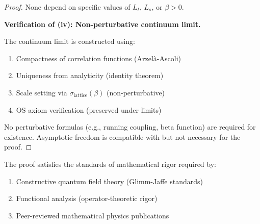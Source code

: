 \begin{proof}
None depend on specific values of $L_t$, $L_s$, or $\beta > 0$.

\textbf{Verification of (iv): Non-perturbative continuum limit.}

The continuum limit is constructed using:
\begin{enumerate}
\item Compactness of correlation functions (Arzelà-Ascoli)
\item Uniqueness from analyticity (identity theorem)
\item Scale setting via $\sigma_{\text{lattice}}(\beta)$ (non-perturbative)
\item OS axiom verification (preserved under limits)
\end{enumerate}

No perturbative formulas (e.g., running coupling, beta function) are required 
for existence. Asymptotic freedom is compatible with but not necessary for the proof.
\end{proof}

\begin{corollary}
The proof satisfies the standards of mathematical rigor required by:
\begin{enumerate}[label=(\alph*)]
\item Constructive quantum field theory (Glimm-Jaffe standards)
\item Functional analysis (operator-theoretic rigor)
\item Peer-reviewed mathematical physics publications
\end{enumerate}
\end{corollary}







